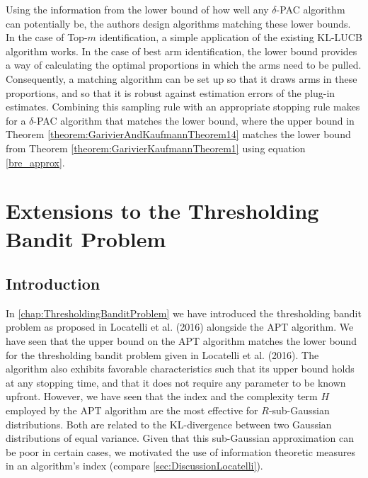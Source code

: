 \documentclass[11pt,]{article}
\begin{document}
Using the information from the lower bound of how well any
\(\delta\)-PAC algorithm can potentially be, the authors design
algorithms matching these lower bounds. In the case of Top-\(m\)
identification, a simple application of the existing KL-LUCB algorithm
works. In the case of best arm identification, the lower bound provides
a way of calculating the optimal proportions in which the arms need to
be pulled. Consequently, a matching algorithm can be set up so that it
draws arms in these proportions, and so that it is robust against
estimation errors of the plug-in estimates. Combining this sampling rule
with an appropriate stopping rule makes for a \(\delta\)-PAC algorithm
that matches the lower bound, where the upper bound in Theorem
\ref{theorem:GarivierAndKaufmannTheorem14} matches the lower bound from
Theorem \ref{theorem:GarivierKaufmannTheorem1} using equation
\eqref{bre_approx}.

\newpage

\section{\texorpdfstring{Extensions to the Thresholding Bandit Problem
\label{chap:Extensions}}{Extensions to the Thresholding Bandit Problem }}\label{extensions-to-the-thresholding-bandit-problem}

\subsection{\texorpdfstring{Introduction
\label{sec:ExtensionsIntroduction}}{Introduction }}\label{introduction-1}

In \autoref{chap:ThresholdingBanditProblem} we have introduced the
thresholding bandit problem as proposed in Locatelli et al. (2016)
alongside the APT algorithm. We have seen that the upper bound on the
APT algorithm matches the lower bound for the thresholding bandit
problem given in Locatelli et al. (2016). The algorithm also exhibits
favorable characteristics such that its upper bound holds at any
stopping time, and that it does not require any parameter to be known
upfront. However, we have seen that the index and the complexity term
\(H\) employed by the APT algorithm are the most effective for
\(R\)-sub-Gaussian distributions. Both are related to the KL-divergence
between two Gaussian distributions of equal variance. Given that this
sub-Gaussian approximation can be poor in certain cases, we motivated
the use of information theoretic measures in an algorithm's index
(compare \autoref{sec:DiscussionLocatelli}).
\end{document}
